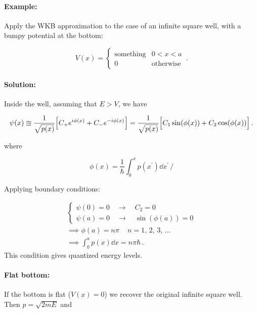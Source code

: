 \documentclass[12pt, titlepage]{article}
\begin{document}
\begin{mdframed}[backgroundcolor=gray!20]
\paragraph*{Example:}
Apply the WKB approximation to the case of an infinite square well, with a bumpy potential at the bottom:

\begin{equation*}
	V(x) = \begin{cases}
	\text{something} & 0<x<a \\
	0 & \text{otherwise}
	\end{cases}
	\,.
\end{equation*}

\paragraph*{Solution:}
Inside the well, assuming that $E>V$, we have

\begin{equation*}
	\psi(x) \approxeq \frac{1}{\sqrt{p(x)}}\Bigl[C_+ e^{i\phi(x)} + C_- e^{-i\phi(x)}\Bigr] = \frac{1}{\sqrt{p(x)}}\Bigl[C_1\sin(\phi(x)) + C_2\cos(\phi(x))\Bigr] \,.
\end{equation*}

where

\begin{equation*}
	\phi(x) = \frac{1}{\hbar}\int_{0}^{x}p(x^\prime)\dd{x^\prime} \,/
\end{equation*}

Applying boundary conditions:

\begin{align*}
	\left\{
	\begin{array}{l}
	\psi(0) = 0 \quad\rightarrow\quad C_2 = 0 \\[4pt]
	\psi(a) = 0 \quad\rightarrow\quad \sin(\phi(a)) = 0
	\end{array}	
	\right. \\[4pt]
	\implies \phi(a) = n\pi\,\quad n=1,\, 2,\, 3,\,\ldots \\[4pt]
	\implies \int_{0}^{a}p(x)\dd{x} = n\pi\hbar \,.
\end{align*}
This condition gives quantized energy levels.

\paragraph*{Flat bottom:}
If the bottom is flat ($V(x) = 0$) we recover the original infinite square well. Then $p = \sqrt{2mE}$ and


\end{mdframed}
\end{document}
